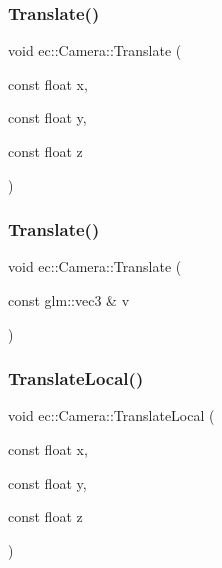 \subsubsection{\texorpdfstring{Translate()}{Translate()}\hspace{0.1cm}{\footnotesize\ttfamily [1/2]}}
{\footnotesize\ttfamily void ec\+::\+Camera\+::\+Translate (\begin{DoxyParamCaption}\item[{const float}]{x,  }\item[{const float}]{y,  }\item[{const float}]{z }\end{DoxyParamCaption})}

\mbox{\label{classec_1_1_camera_a89e831dd0fbd418a7579b820679cdb01}} 
\subsubsection{\texorpdfstring{Translate()}{Translate()}\hspace{0.1cm}{\footnotesize\ttfamily [2/2]}}
{\footnotesize\ttfamily void ec\+::\+Camera\+::\+Translate (\begin{DoxyParamCaption}\item[{const glm\+::vec3 \&}]{v }\end{DoxyParamCaption})}

\mbox{\label{classec_1_1_camera_ac3a7ee291d1f574d1f1aae580b11ec6f}} 
\subsubsection{\texorpdfstring{Translate\+Local()}{TranslateLocal()}\hspace{0.1cm}{\footnotesize\ttfamily [1/2]}}
{\footnotesize\ttfamily void ec\+::\+Camera\+::\+Translate\+Local (\begin{DoxyParamCaption}\item[{const float}]{x,  }\item[{const float}]{y,  }\item[{const float}]{z }\end{DoxyParamCaption})}


